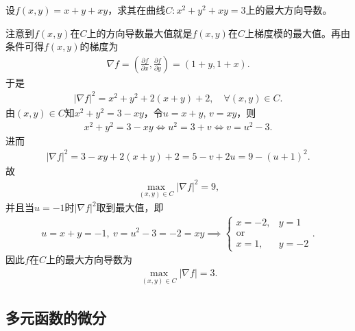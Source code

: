 \documentclass[../../main.tex]{subfiles}%
\begin{document}
\begin{example}
设$f(x,y) = x + y + xy$，求其在曲线$C: x^2 + y^2 + xy = 3$上的最大方向导数。
\end{example}
\begin{solution}
注意到$f(x,y)$在$C$上的方向导数最大值就是$f(x,y)$在$C$上梯度模的最大值。再由条件可得$f(x,y)$的梯度为
\begin{align*}
\nabla f = \left( \frac{\partial f}{\partial x}, \frac{\partial f}{\partial y} \right) = (1+y, 1+x).
\end{align*}
于是
\begin{align*}
|\nabla f|^2 = x^2 + y^2 + 2(x+y) + 2, \quad \forall (x,y) \in C.
\end{align*}
由$(x,y) \in C$知$x^2 + y^2 = 3 - xy$，令$u = x + y$, $v = xy$，则
\begin{align*}
x^2 + y^2 = 3 - xy \iff u^2 = 3 + v \iff v = u^2 - 3.
\end{align*}
进而
\begin{align*}
|\nabla f|^2 = 3 - xy + 2(x+y) + 2 = 5 - v + 2u = 9 - (u+1)^2.
\end{align*}
故
\begin{align*}
\max\limits_{(x,y) \in C} |\nabla f|^2 = 9,
\end{align*}
并且当$u = -1$时$|\nabla f|^2$取到最大值，即
\begin{align*}
u = x + y = -1,\ v = u^2 - 3 = -2 = xy \implies
\begin{cases}
x = -2, & y = 1 \\
\text{or} \\
x = 1, & y = -2
\end{cases}.
\end{align*}
因此$f$在$C$上的最大方向导数为
\begin{align*}
\max\limits_{(x,y) \in C} |\nabla f| = 3.
\end{align*}
\end{solution}


\subsection{多元函数的微分}
\end{document}
